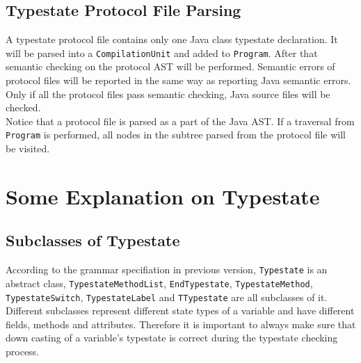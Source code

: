 \documentclass[]{article}
\begin{document}
\subsection{Typestate Protocol File Parsing}
A typestate protocol file contains only one Java class typestate declaration. It will be parsed into a \texttt{CompilationUnit} and added to \texttt{Program}. After that semantic checking on the protocol AST will be performed. Semantic errors of protocol files will be reported in the same way as reporting Java semantic errors. Only if all the protocol files pass semantic checking, Java source files will be checked. \\[0.2cm]
Notice that a protocol file is parsed as a part of the Java AST. If a traversal from \texttt{Program} is performed, all nodes in the subtree parsed from the protocol file will be visited.

\section{Some Explanation on Typestate}
\subsection{Subclasses of Typestate}
According to the grammar specifiation in previous version, \texttt{Typestate} is an abstract class, \texttt{TypestateMethodList}, \texttt{EndTypestate}, \texttt{TypestateMethod}, \texttt{TypestateSwitch}, \texttt{TypestateLabel} and \texttt{TTypestate} are all subclasses of it. \\[0.2cm]
Different subclasses represent different state types of a variable and have different fields, methods and attributes. Therefore it is important to always make sure that down casting of a variable's typestate is correct during the typestate checking process.
\end{document}
